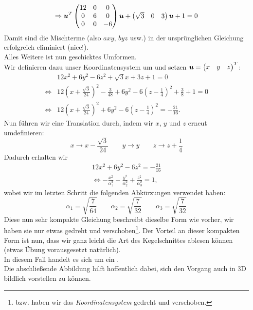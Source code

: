 \begin{Beispiel}
\begin{align*}
        \Rightarrow {{\text{\boldmath${u}$}}}^T\begin{pmatrix}12&0&0\\0&6&0\\0&0&-6\end{pmatrix}{{\text{\boldmath${u}$}}} + \begin{pmatrix}\sqrt{3}&0&3\end{pmatrix}{{\text{\boldmath${u}$}}} + 1 = 0
    \end{align*}
    Damit sind die Mischterme (also $axy$, $byz$ usw.) in der ursprünglichen Gleichung erfolgreich eliminiert (nice!).\\
    Alles Weitere ist nun geschicktes Umformen.\\
    Wir definieren dazu unser Koordinatensystem um und setzen ${{\text{\boldmath${u}$}}}=\begin{pmatrix}x&y&z\end{pmatrix}^T$:
    \begin{align*}
        &12x^2+6y^2-6z^2+\sqrt{3}x+3z+1=0 \\
        \Leftrightarrow &12(x+\frac{\sqrt{3}}{24})^2-\frac{3}{48}+6y^2-6(z-\frac{1}{4})^2+\frac{3}{8} + 1 = 0 \\
        \Leftrightarrow &12(x+\frac{\sqrt{3}}{24})^2 + 6y^2 - 6(z-\frac{1}{4})^2 = -\frac{21}{16}.
    \end{align*}
    Nun führen wir eine Translation durch, indem wir $x$, $y$ und $z$ erneut umdefinieren:
    \begin{equation*}
        x \longrightarrow x-\frac{\sqrt{3}}{24} \qquad y \longrightarrow y \qquad z \longrightarrow z+\frac{1}{4}
    \end{equation*}
    Dadurch erhalten wir
    \begin{align*}
        12x^2+6y^2-6z^2=-\frac{21}{16} \\
        \Leftrightarrow -\frac{x^2}{\alpha_1^2}-\frac{y^2}{\alpha_2^2}+\frac{z^2}{\alpha_3^2}=1,
    \end{align*}
    wobei wir im letzten Schritt die folgenden Abkürzungen verwendet haben:
    \begin{equation*}
        \alpha_1 = \sqrt{\frac{7}{64}} \qquad \alpha_2 = \sqrt{\frac{7}{32}} \qquad \alpha_3 = \sqrt{\frac{7}{32}}
    \end{equation*}
    Diese nun sehr kompakte Gleichung beschreibt dieselbe Form wie vorher, wir haben sie nur etwas gedreht und verschoben\footnote{bzw. haben wir das \textit{Koordinatensystem} gedreht und verschoben.}. Der Vorteil an dieser kompakten Form ist nun, dass wir ganz leicht die Art des Kegelschnittes ablesen können (etwas Übung vorausgesetzt natürlich).\\
    In diesem Fall handelt es sich um ein . \\
    Die abschließende Abbildung hilft hoffentlich dabei, sich den Vorgang auch in 3D bildlich vorstellen zu können.

\end{Beispiel}

